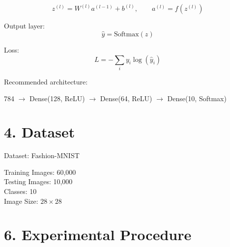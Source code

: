 \documentclass[11pt]{article}
\begin{document}
\[
z^{(l)}=W^{(l)}a^{(l-1)}+b^{(l)},\qquad
a^{(l)}=f(z^{(l)})
\]

Output layer:
\[
\hat y=\mathrm{Softmax}(z)
\]

Loss:
\[
L=-\sum_i y_i\log(\hat y_i)
\]

Recommended architecture:

\begin{center}
784 $\rightarrow$ Dense(128, ReLU) $\rightarrow$ Dense(64, ReLU) $\rightarrow$ Dense(10, Softmax)
\end{center}

\section*{4. Dataset}
Dataset: Fashion-MNIST

Training Images: 60,000 \\
Testing Images: 10,000 \\
Classes: 10 \\
Image Size: $28\times28$


\section*{6. Experimental Procedure}
\end{document}
